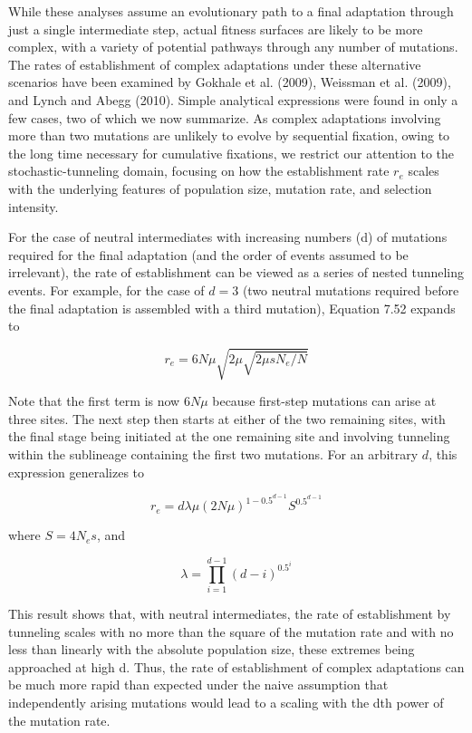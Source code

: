 \documentclass{article}
\begin{document}
While these analyses assume an evolutionary path to a final adaptation through just a single intermediate step, actual fitness surfaces are likely to be more complex, with a variety of potential pathways through any number of mutations. The rates of establishment of complex adaptations under these alternative scenarios have been examined by Gokhale et al. (2009), Weissman et al. (2009), and Lynch and Abegg (2010). Simple analytical expressions were found in only a few cases, two of which we now summarize. As complex adaptations involving more than two mutations are unlikely to evolve by sequential fixation, owing to the long time necessary for cumulative fixations, we restrict our attention to the stochastic-tunneling domain, focusing on how the establishment rate  $ r_{e} $ scales with the underlying features of population size, mutation rate, and selection intensity.

For the case of neutral intermediates with increasing numbers (d) of mutations required for the final adaptation (and the order of events assumed to be irrelevant), the rate of establishment can be viewed as a series of nested tunneling events. For example, for the case of  $ d = 3 $ (two neutral mutations required before the final adaptation is assembled with a third mutation), Equation 7.52 expands to

\begin{equation}
r_{e}=6N\mu\sqrt{2\mu\sqrt{2\mu sN_{e}/N}}
\tag{7.53a}
\label{eq:7_53a}
\end{equation}

Note that the first term is now  $ 6N\mu $ because first-step mutations can arise at three sites. The next step then starts at either of the two remaining sites, with the final stage being initiated at the one remaining site and involving tunneling within the sublineage containing the first two mutations. For an arbitrary  $ d $, this expression generalizes to

\begin{equation}
r_{e}=d\lambda\mu(2N\mu)^{1-0.5^{d-1}}S^{0.5^{d-1}}
\tag{7.53b}
\label{eq:7_53b}
\end{equation}

where  $ S = 4N_{e}s $, and

\begin{equation}
\lambda=\prod_{i=1}^{d-1}(d-i)^{0.5^{i}}
\tag{7.53c}
\label{eq:7_53c}
\end{equation}

This result shows that, with neutral intermediates, the rate of establishment by tunneling scales with no more than the square of the mutation rate and with no less than linearly with the absolute population size, these extremes being approached at high d. Thus, the rate of establishment of complex adaptations can be much more rapid than expected under the naive assumption that independently arising mutations would lead to a scaling with the dth power of the mutation rate.
\end{document}
